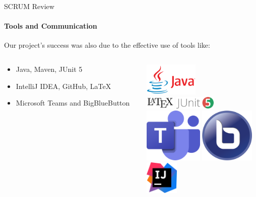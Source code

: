 \documentclass[
ngerman,%
authorontitle=true,
]{bfhbeamer}
\begin{document}
	\begin{frame}{SCRUM Review}
		\framesubtitle{Tools and Communication}
		Our project's success was also due to the effective use of tools like:
		\begin{columns}
			\begin{column}{0.6\textwidth}
				\begin{itemize}
					\item Java, Maven, JUnit 5
					\item IntelliJ IDEA, GitHub, LaTeX
					\item Microsoft Teams and BigBlueButton
				\end{itemize}
			\end{column}
			\begin{column}{0.4\textwidth}
				\centering
				\includegraphics[height=1.6cm]{pictures/Java-Logo}\\
				\vspace{1em}
				\includegraphics[height=0.6cm]{pictures/LaTeX_logo}
				\vspace{1em}
				\includegraphics[height=0.6cm]{pictures/JUnit_5_Logo}\\
				\vspace{1em}
				\includegraphics[height=2.6cm]{pictures/final_presentation/MS-Teams_Logo}
				\vspace{1em}
				\includegraphics[height=2.6cm]{pictures/final_presentation/BigBlueButton_icon}\\
				\vspace{1em}
				\includegraphics[height=1.6cm]{pictures/IntelliJ_IDEA_Icon}
			\end{column}
		\end{columns}
	\end{frame}
	
\end{document}
